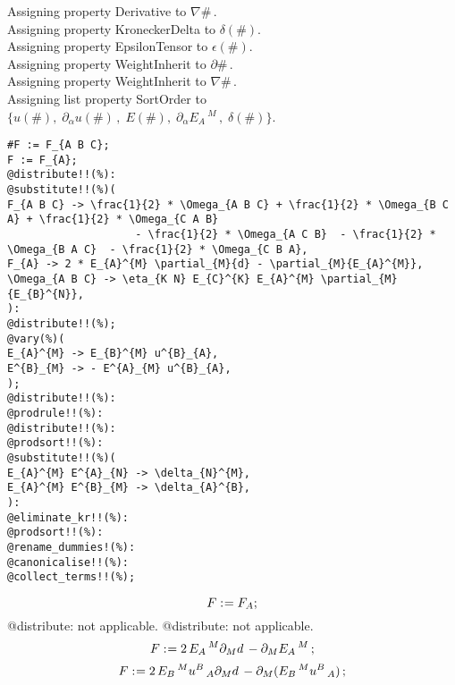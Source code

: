 \documentclass[11pt]{article}
\def\specialcolon{\mathrel{\mathop{:}}\hspace{-.5em}}
\begin{document}
Assigning property Derivative to $\nabla{\#}\, $.
\\
Assigning property KroneckerDelta to $\delta(\#)$.
\\
Assigning property EpsilonTensor to $\epsilon(\#)$.
\\
Assigning property WeightInherit to $\partial{\#}\, $.
\\
Assigning property WeightInherit to $\nabla{\#}\, $.
\\
Assigning list property SortOrder to $\{u(\#),\; {\partial}_{\alpha}{u(\#)}\, ,\; E(\#),\; {\partial}_{\alpha}{{E}_{A}\,^{M}}\, ,\; \delta(\#)\}$.
\\
{\color[named]{Blue}\begin{verbatim}
#F := F_{A B C};
F := F_{A};
@distribute!!(%):
@substitute!!(%)(
F_{A B C} -> \frac{1}{2} * \Omega_{A B C} + \frac{1}{2} * \Omega_{B C A} + \frac{1}{2} * \Omega_{C A B}
                    - \frac{1}{2} * \Omega_{A C B}  - \frac{1}{2} * \Omega_{B A C}  - \frac{1}{2} * \Omega_{C B A},
F_{A} -> 2 * E_{A}^{M} \partial_{M}{d} - \partial_{M}{E_{A}^{M}},
\Omega_{A B C} -> \eta_{K N} E_{C}^{K} E_{A}^{M} \partial_{M}{E_{B}^{N}},
):
@distribute!!(%);
@vary(%)(
E_{A}^{M} -> E_{B}^{M} u^{B}_{A},
E^{B}_{M} -> - E^{A}_{M} u^{B}_{A},
);
@distribute!!(%):
@prodrule!!(%):
@distribute!!(%):
@prodsort!!(%):
@substitute!!(%)(
E_{A}^{M} E^{A}_{N} -> \delta_{N}^{M},
E_{A}^{M} E^{B}_{M} -> \delta_{A}^{B},
):
@eliminate_kr!!(%):
@prodsort!!(%):
@rename_dummies!(%):
@canonicalise!!(%):
@collect_terms!!(%);
\end{verbatim}}
\begin{dmath*}[compact, spread=2pt]
F\specialcolon{}= {F}_{A};
\end{dmath*}
@distribute: not applicable.
@distribute: not applicable.
\begin{dmath*}[compact, spread=2pt]
F\specialcolon{}= 2\, {E}_{A}\,^{M} {\partial}_{M}{d}\,  - {\partial}_{M}{{E}_{A}\,^{M}}\, ;
\end{dmath*}
\begin{dmath*}[compact, spread=2pt]
F\specialcolon{}= 2\, {E}_{B}\,^{M} {u}^{B}\,_{A} {\partial}_{M}{d}\,  - {\partial}_{M}{({E}_{B}\,^{M} {u}^{B}\,_{A})}\, ;
\end{dmath*}
\end{document}
